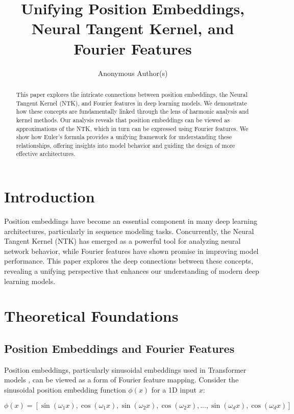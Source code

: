 \documentclass{article}
\title{Unifying Position Embeddings, Neural Tangent Kernel, and Fourier Features}
\author{Anonymous Author(s)}
\begin{document}
\maketitle

\begin{abstract}
This paper explores the intricate connections between position embeddings, the Neural Tangent Kernel (NTK), and Fourier features in deep learning models. We demonstrate how these concepts are fundamentally linked through the lens of harmonic analysis and kernel methods. Our analysis reveals that position embeddings can be viewed as approximations of the NTK, which in turn can be expressed using Fourier features. We show how Euler's formula provides a unifying framework for understanding these relationships, offering insights into model behavior and guiding the design of more effective architectures.
\end{abstract}

\section{Introduction}

Position embeddings have become an essential component in many deep learning architectures, particularly in sequence modeling tasks. Concurrently, the Neural Tangent Kernel (NTK) has emerged as a powerful tool for analyzing neural network behavior, while Fourier features have shown promise in improving model performance. This paper explores the deep connections between these concepts, revealing a unifying perspective that enhances our understanding of modern deep learning models.

\section{Theoretical Foundations}

\subsection{Position Embeddings and Fourier Features}

Position embeddings, particularly sinusoidal embeddings used in Transformer models \citep{Vaswani2017}, can be viewed as a form of Fourier feature mapping. Consider the sinusoidal position embedding function $\phi(x)$ for a 1D input $x$:

\begin{equation}
    \phi(x) = [\sin(\omega_1 x), \cos(\omega_1 x), \sin(\omega_2 x), \cos(\omega_2 x), ..., \sin(\omega_d x), \cos(\omega_d x)]
\end{equation}
\end{document}
